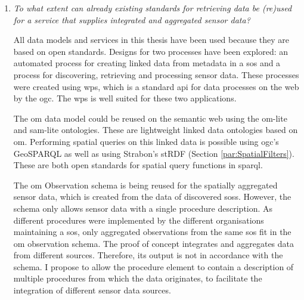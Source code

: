 \begin{enumerate}
However, the down side of the detailed semantic knowledge base is that more data has to be transferred over the internet. First a \acs{sparql} query has to be made with a spatial filter, which includes verbose \ac{wkt} geometries. Then an \ac{rdf} document containing detailed information about each sensor is returned, based on which \ac{sos} requests are performed. If only the addresses of \aclp{sos} are returned, which have sensors inside a certain bounding box, both the  requests and responses are smaller. The detailed spatial query is then performed by the \aclp{sos} and does not require as much data to be transferred over the internet, which makes it a more efficient procedure. 

Still, discovering sensors is only a matter of seconds in the proof of concept. On the other hand, automatically retrieving observation data from \aclp{sos} can take up to a couple minutes, depending on the amount of sensors for which data is requested and the temporal range. However, it should be noted that performance optimisation is beyond the scope of this thesis. It is likely that this can still be improved significantly in the future (see Chapter \ref{chap:futureResearch}).              


\item \textit{To what extent can already existing standards for retrieving data be (re)used for a service that supplies integrated and aggregated sensor data?}%

All data models and services in this thesis have been used because they are based on open standards. Designs for two processes have been explored: an automated process for creating linked data from metadata in a \ac{sos} and a process for discovering, retrieving and processing sensor data. These processes were created using \ac{wps}, which is a standard \ac{api} for data processes on the web by the \ac{ogc}. The \ac{wps} is well suited for these two applications.

The \ac{om} data model could be reused on the semantic web using the om-lite and sam-lite ontologies. These are lightweight linked data ontologies based on \ac{om}. Performing spatial queries on this linked data is possible using \ac{ogc}'s GeoSPARQL as well as using Strabon's stRDF (Section \ref{par:SpatialFilters}). These are both open standards for spatial query functions in \acs{sparql}.

The \ac{om} Observation schema is being reused for the spatially aggregated sensor data, which is created from the data of discovered \aclp{sos}. However, the schema only allows sensor data with a single procedure description. As different procedures were implemented by the different organisations maintaining a \ac{sos}, only aggregated observations from the same \ac{sos} fit in the \ac{om} observation schema. The proof of concept integrates and aggregates data from different sources. Therefore, its output is not in accordance with the schema. I propose to allow the procedure element to contain a description of multiple procedures from which the data originates, to facilitate the integration of different sensor data sources. 
\end{enumerate}


